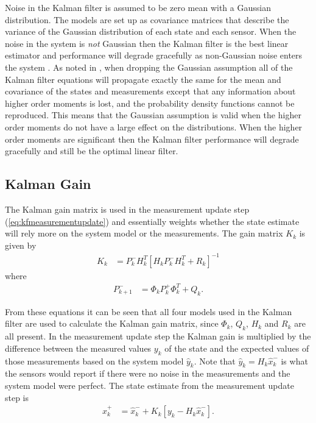 Noise in the Kalman filter is assumed to be zero mean with a Gaussian distribution. The models are set up as covariance matrices that describe the variance of the Gaussian distribution of each state and each sensor. When the noise in the system is \textit{not} Gaussian then the Kalman filter is the best linear estimator and performance will degrade gracefully as non-Gaussian noise enters the system \cite{Simon10}. As noted in \cite{AndersonMoore79}, when dropping the Gaussian assumption all of the Kalman filter equations will propagate exactly the same for the mean and covariance of the states and measurements except that any information about higher order moments is lost, and the probability density functions cannot be reproduced. This means that the Gaussian assumption is valid when the higher order moments do not have a large effect on the distributions. When the higher order moments are significant then the Kalman filter performance will degrade gracefully and still be the optimal linear filter.

\subsection{Kalman Gain}
\label{kfKalmanGain}
The Kalman gain matrix is used in the measurement update step (\ref{eq:kfmeasurementupdate}) and essentially weights whether the state estimate will rely more on the system model or the measurements. The gain matrix $K_k$ is given by
\begin{align*}
K_k &= P_k^-H_k^T\left[H_kP_k^-H_k^T + R_k\right]^{-1}
\end{align*}
where
\begin{align*}
P_{k+1}^- &= \Phi_kP_k^+\Phi_k^T + Q_k.
\end{align*}

From these equations it can be seen that all four models used in the Kalman filter are used to calculate the Kalman gain matrix, since $\Phi_k$, $Q_k$, $H_k$ and $R_k$ are all present. In the measurement update step the Kalman gain is multiplied by the difference between the measured values $y_k$ of the state and the expected values of those measurements based on the system model $\hat{y}_k$. Note that $\hat{y}_k = H_k\hat{x}_k^-$ is what the sensors would report if there were no noise in the measurements and the system model were perfect. The state estimate from the measurement update step is
\begin{align*}
\hat{x}_k^+ &= \hat{x}_k^- + K_k\left[y_k - H_k\hat{x}_k^-\right].
\end{align*}

